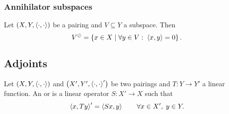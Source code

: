 \subsubsection{Annihilator subspaces}
\begin{lemma}
Let $\left( X,Y,\left\langle \cdot,\cdot \right\rangle \right)$ be a pairing and $V\subseteq Y$ a subspace. Then
\[ V^{\oslash} = \left\{ x\in X \;\middle|\; \forall y\in V:\;\left\langle x,y \right\rangle = 0 \right\}. \]
\end{lemma}


\subsection{Adjoints}
\begin{definition}
Let $\left( X,Y,\left\langle \cdot,\cdot \right\rangle \right)$ and $\left( X',Y',\left\langle \cdot,\cdot \right\rangle' \right)$ be two pairings and $T: Y\to Y'$ a linear function. An  or  is a linear operator $S: X'\to X$ such that
\[ \left\langle x, Ty \right\rangle' = \left\langle Sx, y \right\rangle \qquad \forall x\in X', \; y\in Y. \]
\end{definition}

